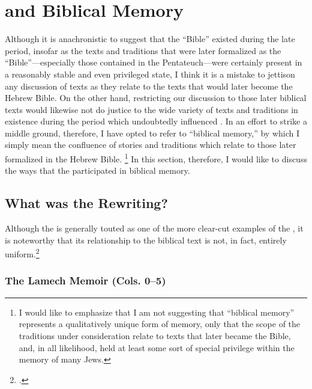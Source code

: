 
\section{\ga and Biblical Memory}


Although it is anachronistic to suggest that the ``Bible''  existed during the late \secondtemple period, insofar as the texts and traditions that were later formalized as the ``Bible''---especially those contained in the Pentateuch---were certainly present in a reasonably stable and even privileged state, I think it is a mistake to jettison any discussion of \rwb texts as they relate to the texts that would later become the Hebrew Bible. On the other hand, restricting our discussion to those later biblical texts would likewise not do justice to the wide variety of texts and traditions in existence during the \secondtemple period which undoubtedly influenced \ga. In an effort to strike a middle ground, therefore, I have opted to refer to ``biblical memory,'' by which I simply mean the confluence of stories and traditions which relate to those later formalized in the Hebrew Bible.%
%
\footnote{I would like to emphasize that I am not suggesting that ``biblical memory'' represents a qualitatively unique form of memory, only that the scope of the traditions under consideration relate to texts that later became the Bible, and, in all likelihood, held at least some sort of special privilege within the memory of many \secondtemple Jews.}
%
In this section, therefore, I would like to discuss the ways that the \ga participated in biblical memory.

\subsection{What was the \ga Rewriting?}

Although the \ga is generally touted as one of the more clear-cut examples of the \rwb, it is noteworthy that its relationship to the biblical text is not, in fact, entirely uniform.\footnote{\cite[333]{bernstein_berthelot-etal2010}.}


\subsubsection{The Lamech Memoir (Cols. 0--5)}

